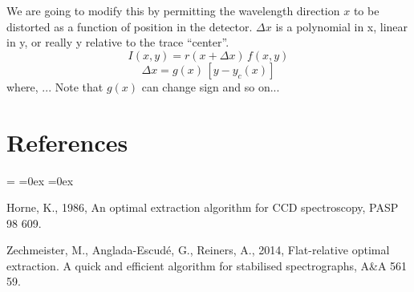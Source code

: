 \documentclass[12pt, letterpaper]{article}
\begin{document}
We are going to modify this by permitting the wavelength direction $x$
to be distorted as a function of position in the detector.
$\Delta x$ is a polynomial in x, linear in y, or really y relative to
the trace ``center''.
\begin{equation}
I(x,y) = r(x + \Delta x)\,f(x, y)
\end{equation}
\begin{equation}
\Delta x = g(x)\,[y - y_c(x)]
\end{equation}
where, ...
Note that $g(x)$ can change sign and so on...

\section*{References}
\begin{list}{}{%
\rightmargin=0in
\leftmargin=\parindent
{}\leftmargin
{}\leftmargin
\itemsep=0ex
\parsep=0ex
}
\item Horne, K., 1986,
An optimal extraction algorithm for CCD spectroscopy,
PASP 98 609.
\item Zechmeister, M., Anglada-Escud\'e, G., Reiners, A., 2014,
Flat-relative optimal extraction. A quick and efficient algorithm for stabilised spectrographs,
A\&A 561 59.
\end{list}
\end{document}
